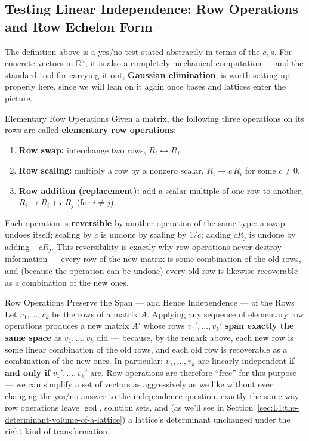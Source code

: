 \subsection{Testing Linear Independence: Row Operations and Row Echelon Form}
\label{sec:L1:testing-linear-independence-row-operatio}

The definition above is a yes/no test stated abstractly in terms of the $c_i$'s. For concrete vectors in $\mathbb{R}^n$, it is also a completely mechanical computation --- and the standard tool for carrying it out, \textbf{Gaussian elimination}, is worth setting up properly here, since we will lean on it again once bases and lattices enter the picture.

\begin{defbox}{Elementary Row Operations}
Given a matrix, the following three operations on its rows are called \textbf{elementary row operations}:
\begin{enumerate}[leftmargin=*, label=(E\arabic*)]
  \item \textbf{Row swap:} interchange two rows, $R_i \leftrightarrow R_j$.
  \item \textbf{Row scaling:} multiply a row by a nonzero scalar, $R_i \to c\,R_i$ for some $c \neq 0$.
  \item \textbf{Row addition (replacement):} add a scalar multiple of one row to another, $R_i \to R_i + c\,R_j$ (for $i \neq j$).
\end{enumerate}
Each operation is \textbf{reversible} by another operation of the same type: a swap undoes itself; scaling by $c$ is undone by scaling by $1/c$; adding $c R_j$ is undone by adding $-c R_j$. This reversibility is exactly why row operations never destroy information --- every row of the new matrix is some combination of the old rows, and (because the operation can be undone) every old row is likewise recoverable as a combination of the new ones.
\end{defbox}

\begin{factbox}{Row Operations Preserve the Span --- and Hence Independence --- of the Rows}
Let $v_1,\ldots,v_k$ be the rows of a matrix $A$. Applying any sequence of elementary row operations produces a new matrix $A'$ whose rows $v_1',\ldots,v_k'$ \textbf{span exactly the same space} as $v_1,\ldots,v_k$ did --- because, by the remark above, each new row is some linear combination of the old rows, and each old row is recoverable as a combination of the new ones. In particular: $v_1,\ldots,v_k$ are linearly independent \textbf{if and only if} $v_1',\ldots,v_k'$ are. Row operations are therefore ``free'' for this purpose --- we can simplify a set of vectors as aggressively as we like without ever changing the yes/no answer to the independence question, exactly the same way row operations leave $\gcd$, solution sets, and (as we'll see in Section~\ref{sec:L1:the-determinant-volume-of-a-lattice}) a lattice's determinant unchanged under the right kind of transformation.
\end{factbox}

